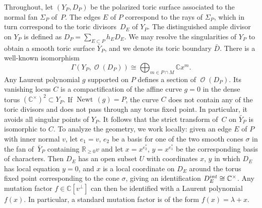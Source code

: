 \documentclass[11pt]{article}
\numberwithin{equation}{section}
\DeclareMathOperator{\Newt}{{Newt \,}}
\DeclareMathOperator{\cO}{\mathcal{O}}
\newcommand{\CC}{\mathbb{C}}
\newcommand{\RR}{\mathbb{R}}
\begin{document}
	Throughout, let $(Y_P, D_P)$ be the polarized toric surface associated to the normal fan $\Sigma_P$ of~$P$. The edges $E$ of $P$ correspond to the rays of $\Sigma_P$, which in turn correspond to the toric divisors~$D_E$ of $Y_{P}$. The distinguished ample divisor on $Y_P$ is defined as
$D_P=\sum_{E \subset P} h_ED_E$.
	We may resolve the singularities of ${Y}_P$ to obtain a smooth toric surface $\bar{Y}_P$, and we denote its toric boundary $\bar{D}$.
	There is a well-known isomorphism
	\begin{equation}\label{eq:sections}
		\Gamma(Y_P, \cO(D_P)) \cong \bigoplus_{m \in P \cap M} \CC x^m.
	\end{equation}
Any Laurent polynomial $g$ supported on $P$ defines a section of $\cO(D_P)$. Its vanishing locus $C$ is a compactification of the affine curve $g=0$ in the dense torus $(\CC^\times)^2 \subset Y_P$. If $\Newt(g)=P$, the curve $C$ does not contain any of the toric divisors and does not pass through any torus fixed point. In particular, it avoids all singular points of $Y_P$.
	It follows that the strict transform of~$C$ on $\bar{Y}_P$ is isomorphic to $C$.
	To analyze the geometry, we work locally: given an edge $E$ of $P$ with inner normal $v$, let $e_1=v$, $e_2$ be a basis for one of the two smooth cones $\sigma$ in the fan of~$\bar{Y}_P$ containing $\RR_{\geq 0}v$ and let $x=x^{e_2^*}$, $y=x^{e_1^*}$ be the corresponding basis of characters. Then $D_E$ has an open subset $U$ with coordinates $x$, $y$ in which $D_E$ has local equation $y=0$, and $x$ is a local coordinate on $D_E$ around the torus fixed point corresponding to the cone $\sigma$, giving an identification $D_E^{\rm int} \cong \CC^\times$. Any mutation factor $f \in \CC[v^\perp]$ can then be identified with a Laurent polynomial $f(x)$. In particular, a standard mutation factor is of the form $f(x)=\lambda+x$.
	
\end{document}
